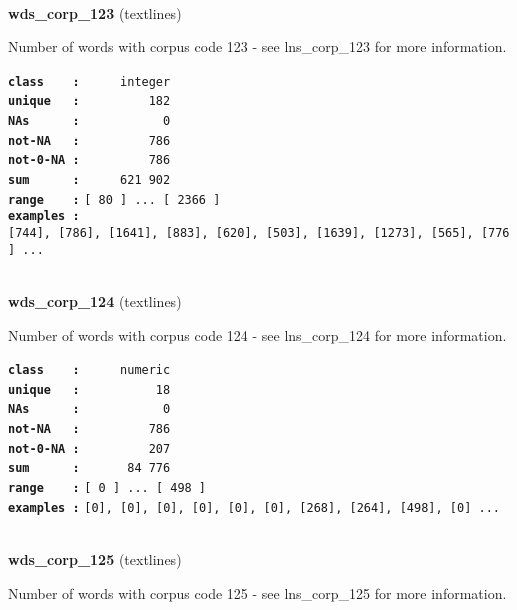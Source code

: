 \documentclass[]{article}
\begin{document}
~

\textbf{wds\_corp\_123} (textlines)

Number of words with corpus code 123 - see lns\_corp\_123 for more
information.

\textbf{\texttt{class\ \ \ \ :}} \texttt{~~~~~integer}\\
\textbf{\texttt{unique\ \ \ :}} \texttt{~~~~~~~~~182}\\
\textbf{\texttt{NAs\ \ \ \ \ \ :}} \texttt{~~~~~~~~~~~0}\\
\textbf{\texttt{not-NA\ \ \ :}} \texttt{~~~~~~~~~786}\\
\textbf{\texttt{not-0-NA\ :}} \texttt{~~~~~~~~~786}\\
\textbf{\texttt{sum\ \ \ \ \ \ :}} \texttt{~~~~~621~902}\\
\textbf{\texttt{range\ \ \ \ :}}
\texttt{{[}\ 80\ {]}\ ...\ {[}\ 2366\ {]}}\\
\textbf{\texttt{examples\ :}}
\texttt{{[}744{]},\ {[}786{]},\ {[}1641{]},\ {[}883{]},\ {[}620{]},\ {[}503{]},\ {[}1639{]},\ {[}1273{]},\ {[}565{]},\ {[}776{]}\ ...}\\

~

\textbf{wds\_corp\_124} (textlines)

Number of words with corpus code 124 - see lns\_corp\_124 for more
information.

\textbf{\texttt{class\ \ \ \ :}} \texttt{~~~~~numeric}\\
\textbf{\texttt{unique\ \ \ :}} \texttt{~~~~~~~~~~18}\\
\textbf{\texttt{NAs\ \ \ \ \ \ :}} \texttt{~~~~~~~~~~~0}\\
\textbf{\texttt{not-NA\ \ \ :}} \texttt{~~~~~~~~~786}\\
\textbf{\texttt{not-0-NA\ :}} \texttt{~~~~~~~~~207}\\
\textbf{\texttt{sum\ \ \ \ \ \ :}} \texttt{~~~~~~84~776}\\
\textbf{\texttt{range\ \ \ \ :}}
\texttt{{[}\ 0\ {]}\ ...\ {[}\ 498\ {]}}\\
\textbf{\texttt{examples\ :}}
\texttt{{[}0{]},\ {[}0{]},\ {[}0{]},\ {[}0{]},\ {[}0{]},\ {[}0{]},\ {[}268{]},\ {[}264{]},\ {[}498{]},\ {[}0{]}\ ...}\\

~

\textbf{wds\_corp\_125} (textlines)

Number of words with corpus code 125 - see lns\_corp\_125 for more
information.
\end{document}
